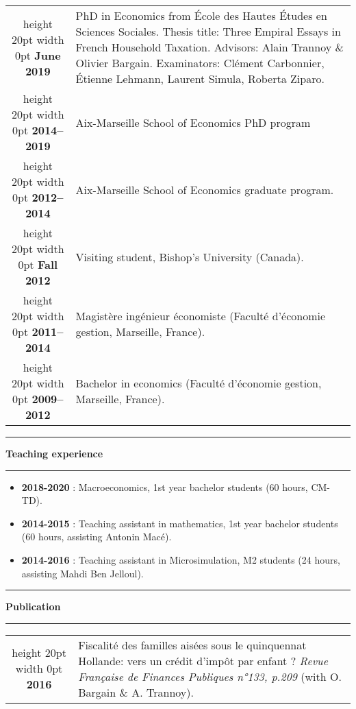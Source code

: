 \documentclass[a4paper,11pt]{article} %
\newcommand\espace{\vrule height 20pt width 0pt}
\newcommand{\titre}[1]{%
	\begin{center}
	\rule{\textwidth}{1pt}
	\par\vspace{0.1cm}
        \textbf{\large #1}
	\par\rule{\textwidth}{1pt}
	\end{center}
	}
\begin{document}
\begin{tabular}{c@{:  }p{}}

\espace
\textbf{June 2019 } & PhD in Economics from École des Hautes Études en Sciences Sociales.
 \newline
  \newline Thesis title: Three Empiral Essays in French Household Taxation. 
 \newline Advisors: Alain Trannoy \& Olivier Bargain. 
 \newline Examinators: Clément Carbonnier, Étienne Lehmann, Laurent Simula, Roberta Ziparo. \\


\espace
\textbf{2014--2019 } & Aix-Marseille School of Economics PhD program \\


\espace
\textbf{2012--2014} & Aix-Marseille School of Economics graduate program.  \\

\espace
\textbf{Fall 2012} & Visiting student, Bishop's University (Canada). \\

\espace
\textbf{2011--2014} & Magistère ingénieur économiste  (Faculté d'économie gestion, Marseille, France). \\

\espace
\textbf{2009--2012} & Bachelor in economics (Faculté d'économie gestion, Marseille, France). \\


\end{tabular}
\titre{Teaching experience}
\begin{itemize}
\item \textbf{2018-2020} : Macroeconomics, 1st year bachelor students (60 hours, CM-TD).
\item \textbf{2014-2015} : Teaching assistant in mathematics, 1st year bachelor students (60 hours, assisting Antonin Macé).
\item \textbf{2014-2016} : Teaching assistant in Microsimulation, M2 students (24 hours, assisting Mahdi Ben Jelloul).

\end{itemize}
\newpage
\titre{Publication}

\begin{tabular}{c@{:  }p{}}
\espace
 \textbf{2016} & Fiscalité des familles aisées sous le quinquennat Hollande: vers un crédit d'impôt par enfant ?   \emph{Revue Française de Finances Publiques n°133, p.209} (with O. Bargain \& A. Trannoy).


\end{tabular}
\end{document}
